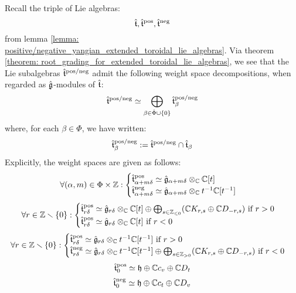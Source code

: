         \begin{corollary}
            Recall the triple of Lie algebras:
                $$\hat{\mathfrak{t}}, \hat{\mathfrak{t}}^{\mathrm{pos}}, \hat{\mathfrak{t}}^{\mathrm{neg}}$$
            from lemma \ref{lemma: positive/negative_yangian_extended_toroidal_lie_algebras}. Via theorem \ref{theorem: root_grading_for_extended_toroidal_lie_algebras}, we see that the Lie subalgebras $\hat{\mathfrak{t}}^{\mathrm{pos}/\mathrm{neg}}$ admit the following weight space decompositions, when regarded as $\hat{\mathfrak{g}}$-modules of $\hat{\mathfrak{t}}$:
                $$\hat{\mathfrak{t}}^{\mathrm{pos}/\mathrm{neg}} \simeq \bigoplus_{\beta \in \hat{\Phi} \cup \{0\}} \hat{\mathfrak{t}}^{\mathrm{pos}/\mathrm{neg}}_{\beta}$$
            where, for each $\beta \in \hat{\Phi}$, we have written:
                $$\hat{\mathfrak{t}}^{\mathrm{pos}/\mathrm{neg}}_{\beta} := \hat{\mathfrak{t}}^{\mathrm{pos}/\mathrm{neg}} \cap \hat{\mathfrak{t}}_{\beta}$$
            Explicitly, the weight spaces are given as follows:
                $$
                    \forall (\alpha, m) \in \Phi \x \Z:
                    \begin{cases}
                        \extendedtoroidal^{\positive}_{\alpha + m\delta} \cong \hat{\g}_{\alpha + m\delta} \tensor_{\bbC} \bbC[t]
                        \\
                        \extendedtoroidal^{\negative}_{\alpha + m\delta} \cong \hat{\g}_{\alpha + m\delta} \tensor_{\bbC} t^{-1}\bbC[t^{-1}]
                    \end{cases}
                $$
                $$
                    \forall r \in \Z \setminus \{0\}:
                    \begin{cases}
                        \text{$\extendedtoroidal^{\positive}_{r\delta} \cong \hat{\g}_{r\delta} \tensor_{\bbC} \bbC[t] \oplus \bigoplus_{s \in \Z_{\leq 0}} (\bbC K_{r, s} \oplus \bbC D_{-r, s})$ if $r > 0$}
                        \\
                        \text{$\extendedtoroidal^{\positive}_{r\delta} \cong \hat{\g}_{r\delta} \tensor_{\bbC} \bbC[t]$ if $r < 0$}
                    \end{cases}
                $$
                $$
                    \forall r \in \Z \setminus \{0\}:
                    \begin{cases}
                        \text{$\extendedtoroidal^{\positive}_{r\delta} \cong \hat{\g}_{r\delta} \tensor_{\bbC} t^{-1}\bbC[t^{-1}]$ if $r > 0$}
                        \\
                        \text{$\extendedtoroidal^{\negative}_{r\delta} \cong \hat{\g}_{r\delta} \tensor_{\bbC} t^{-1}\bbC[t^{-1}] \oplus \bigoplus_{s \in \Z_{> 0}} (\bbC K_{r, s} \oplus \bbC D_{-r, s})$ if $r < 0$}
                    \end{cases}
                $$
                $$\hat{\mathfrak{t}}^{\mathrm{pos}}_0 \simeq \mathfrak{h} \oplus \mathbb{C} c_v \oplus \mathbb{C} D_t$$
                $$\hat{\mathfrak{t}}^{\mathrm{neg}}_0 \simeq \mathfrak{h} \oplus \mathbb{C} c_t \oplus \mathbb{C} D_v$$
        \end{corollary}
        
